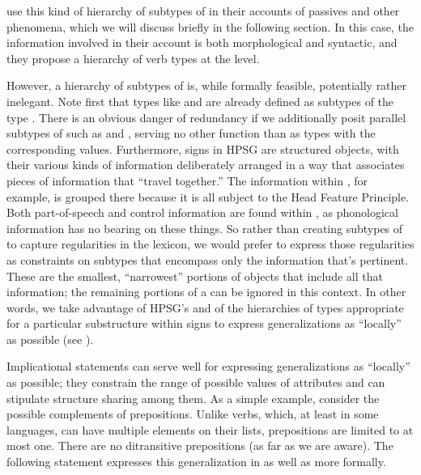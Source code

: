 \documentclass[output=paper,biblatex,babelshorthands,newtxmath,draftmode,colorlinks,citecolor=brown]{langscibook}
\begin{document}
\citet{AckermanandWebelhuth1998}
 use this kind of hierarchy of subtypes of  in their accounts of  passives and other phenomena, which we will discuss briefly in the following section.
In this case, the information involved in their account is both morphological and syntactic, and they propose a hierarchy of verb types at the  level.

However, a hierarchy of subtypes of  is, while formally feasible, potentially rather inelegant.
Note first that types like  and  are already defined as subtypes of the type .
There is an obvious danger of redundancy if we additionally posit parallel subtypes of  such as  and  , serving no other function than as types with the corresponding  values.
Furthermore, signs in HPSG are structured objects, with their various kinds of information deliberately arranged in a way that associates pieces of information that ``travel together.''
The information within , for example, is grouped there because it is all subject to the
Head Feature Principle.
Both part-of-speech and control information are found within , as phonological information has no bearing on these things.
So rather than creating subtypes of  to capture regularities in the lexicon, we would prefer to express those regularities as constraints on subtypes that encompass only the information that's pertinent.
These are the smallest, ``narrowest'' portions of  objects that include all that information; the remaining portions of a  can be ignored in this context.
In other words, we take advantage of HPSG's  and of the hierarchies of types appropriate for a particular substructure within signs to express generalizations as ``locally'' as possible (see ).

Implicational statements can serve well for expressing generalizations as ``locally'' as possible; they constrain the range of possible values of attributes and can stipulate structure sharing among them.
As a simple example, consider the possible complements of prepositions.
Unlike verbs, which, at least in some languages, can have multiple elements on their  lists, prepositions are limited to at most one.
There are no ditransitive prepositions (as far as we are aware).
The following statement expresses this generalization in  as well as more formally.
\end{document}
